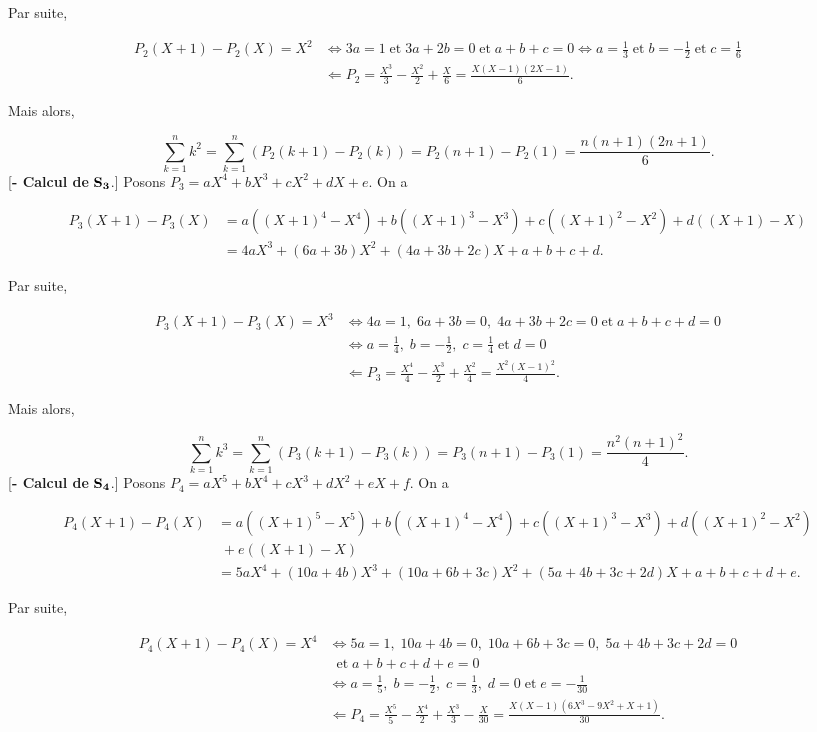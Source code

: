 {\begin{enumerate}
{\begin{itemize}
Par suite,

\begin{align*}
P_2(X+1)-P_2(X)=X^2&\Leftrightarrow 3a=1\;\mbox{et}\;3a+2b=0\;\mbox{et}\;a+b+c=0\Leftrightarrow
a=\frac{1}{3}\;\mbox{et}\;b=-\frac{1}{2}\;\mbox{et}\;c=\frac{1}{6}\\
 &\Leftarrow P_2=\frac{X^3}{3}-\frac{X^2}{2}+\frac{X}{6}=\frac{X(X-1)(2X-1)}{6}.
\end{align*}

Mais alors,

$$\sum_{k=1}^{n}k^2=\sum_{k=1}^{n}(P_2(k+1)-P_2(k))=P_2(n+1)-P_2(1)=\frac{n(n+1)(2n+1)}{6}.$$
[\textbf{- Calcul de} $\bf{S_3}$.] Posons $P_3=aX^4+bX^3+cX^2+dX+e$. On a

\begin{align*}
P_3(X+1)-P_3(X)&=a((X+1)^4-X^4)+b((X+1)^3-X^3)+c((X+1)^2-X^2)+d((X+1)-X)\\
 &=4aX^3+(6a+3b)X^2+(4a+3b+2c)X+a+b+c+d.
\end{align*}

Par suite,

\begin{align*}
P_3(X+1)-P_3(X)=X^3&\Leftrightarrow4a=1,\;6a+3b=0,\;4a+3b+2c=0\;\mbox{et}\;a+b+c+d=0\\
 &\Leftrightarrow
a=\frac{1}{4},\;b=-\frac{1}{2},\;c=\frac{1}{4}\;\mbox{et}\;d=0\\
 &\Leftarrow P_3=\frac{X^4}{4}-\frac{X^3}{2}+\frac{X^2}{4}=\frac{X^2(X-1)^2}{4}.
\end{align*}

Mais alors,

$$\sum_{k=1}^{n}k^3=\sum_{k=1}^{n}(P_3(k+1)-P_3(k))=P_3(n+1)-P_3(1)=\frac{n^2(n+1)^2}{4}.$$
[\textbf{- Calcul de} $\bf{S_4}$.] Posons $P_4=aX^5+bX^4+cX^3+dX^2+eX+f$. On a

\begin{align*}
P_4(X+1)-P_4(X)&=a((X+1)^5-X^5)+b((X+1)^4-X^4)+c((X+1)^3-X^3)+d((X+1)^2-X^2)\\
 &\;+e((X+1)-X)\\
 &=5aX^4+(10a+4b)X^3+(10a+6b+3c)X^2+(5a+4b+3c+2d)X+a+b+c+d+e.
\end{align*}

Par suite,

\begin{align*}
P_4(X+1)-P_4(X)=X^4&\Leftrightarrow5a=1,\;10a+4b=0,\;10a+6b+3c=0,\;5a+4b+3c+2d=0\\
 &\;\;\mbox{et}\;a+b+c+d+e=0\\
 &\Leftrightarrow
a=\frac{1}{5},\;b=-\frac{1}{2},\;c=\frac{1}{3},\;d=0\;\mbox{et}\;e=-\frac{1}{30}\\
 &\Leftarrow P_4=\frac{X^5}{5}-\frac{X^4}{2}+\frac{X^3}{3}-\frac{X}{30}=\frac{X(X-1)(6X^3-9X^2+X+1)}{30}.
\end{align*}


\end{itemize}}
\end{enumerate}}
